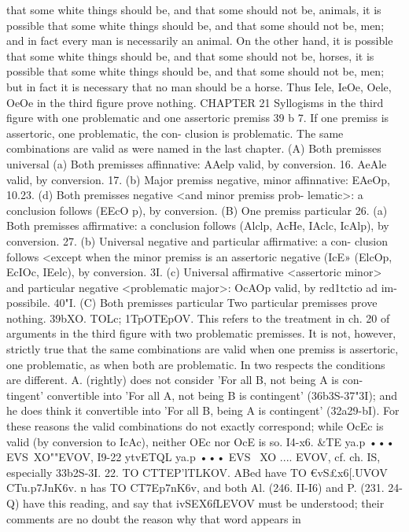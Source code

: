 {{{{{{{{{{{{{that some white things should be, and that some should not be,
animals, it is possible that some white things should be, and that
some should not be, men; and in fact every man is necessarily an
animal. On the other hand, it is possible that some white things
should be, and that some should not be, horses, it is possible that
some white things should be, and that some should not be, men;
but in fact it is necessary that no man should be a horse. Thus
Iele, IeOe, Oele, OeOe in the third figure prove nothing.
CHAPTER 21
Syllogisms in the third figure with one problematic and one assertoric
premiss
39 b 7. If one premiss is assertoric, one problematic, the con-
clusion is problematic. The same combinations are valid as were
named in the last chapter.
(A) Both premisses universal
(a) Both premisses affinnative: AAelp valid, by conversion.
16. AeAle valid, by conversion.
17. (b) Major premiss negative, minor affinnative: EAeOp,
10.23. (d) Both premisses negative <and minor premiss prob-
lematic>: a conclusion follows (EEcO p), by conversion.
(B) One premiss particular
26.
(a) Both premisses affirmative: a conclusion follows (Alclp,
AcHe, IAclc, IcAlp), by conversion.
27. (b) Universal negative and particular affirmative: a con-
clusion follows <except when the minor premiss is an assertoric
negative (IcE» (ElcOp, EcIOc, IEelc), by conversion.
3I. (c) Universal affirmative <assertoric minor> and particular
negative <problematic major>: OcAOp valid, by red1tctio ad im-
possibile.
40"I.
(C) Both premisses particular
Two particular premisses prove nothing.
39bXO. TOLc; 1TpOTEpOV. This refers to the treatment in ch. 20
of arguments in the third figure with two problematic premisses.
It is not, however, strictly true that the same combinations are
valid when one premiss is assertoric, one problematic, as when
both are problematic. In two respects the conditions are different.
A. (rightly) does not consider 'For all B, not being A is con-
tingent' convertible into 'For all A, not being B is contingent'
(36b3S-37"3I); and he does think it convertible into 'For all B,
being A is contingent' (32a29-bI). For these reasons the valid
combinations do not exactly correspond; while OcEc is valid (by
conversion to IcAc), neither OEc nor OcE is so.
I4-x6. &TE ya.p ••• EVS~XO""EVOV, I9-22 ytvETQL ya.p ••• EVS~­
XO .... EVOV, cf. ch. IS, especially 33b2S-3I.
22. TO CTTEP'lTLKOV. ABed have TO €vS£x6[.UVOV CTu.p7JnK6v. n
has TO CT7Ep7}nK6v, and both Al. (246. II-I6) and P. (231. 24-Q) have
this reading, and say that ivSEX6fLEVOV must be understood; their
comments are no doubt the reason why that word appears in
}}}}}}}}}}}}
